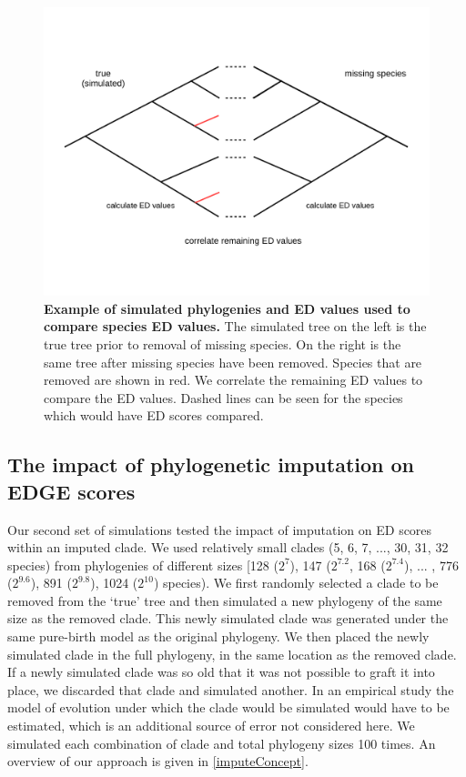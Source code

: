 \documentclass[12pt,english]{article}
\begin{document}
\begin{figure}[!ht]
  \center
  \includegraphics[width=.75\textwidth]{missingSpecies.png}
  \caption{\textbf{Example of simulated phylogenies and ED values used to
  compare species ED values.} The simulated tree on the left is the true tree
  prior to removal of missing species. On the right is the same tree after
  missing species have been removed. Species that are removed are shown in red.
  We correlate the remaining ED values to
  compare the ED values. Dashed lines can be seen for the species which would
  have ED scores compared.}
  \label{missingSpecies}
\end{figure}

\subsection*{The impact of phylogenetic imputation on EDGE scores}
Our second set of simulations tested the impact of imputation on ED scores
within an imputed clade. We used relatively small clades (5, 6, 7, ..., 30, 31,
32 species) from phylogenies of different sizes [128 ($2^7$), 147 ($2^{7.2}$,
168 ($2^{7.4}$), ... , 776 ($2^{9.6}$), 891 ($2^{9.8}$), 1024 ($2^{10}$)
species). We first randomly selected a clade to be removed from the ‘true' tree
and then simulated a new phylogeny of the same size as the removed clade. This
newly simulated clade was generated under the same pure-birth model as the
original phylogeny. We then placed the newly simulated clade in the full
phylogeny, in the same location as the removed clade. If a newly simulated clade
was so old that it was not possible to graft it into place, we discarded that
clade and simulated another. In an empirical study the model of evolution under
which the clade would be simulated would have to be estimated, which is an
additional source of error not considered here. We simulated each combination of
clade and total phylogeny sizes 100 times. An overview of our approach is given
in \ref{imputeConcept}. 
\end{document}
